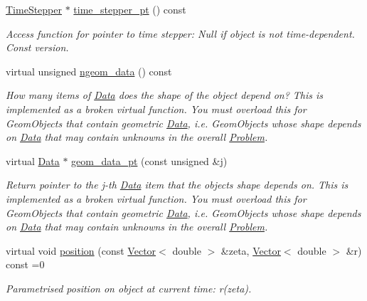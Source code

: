 \begin{DoxyCompactItemize}
\hyperlink{classoomph_1_1TimeStepper}{Time\+Stepper} $\ast$ \hyperlink{classoomph_1_1GeomObject_a02a503606d959d61acb8ca4b94dbc5e6}{time\+\_\+stepper\+\_\+pt} () const
\begin{DoxyCompactList}\small\item\em Access function for pointer to time stepper\+: Null if object is not time-\/dependent. Const version. \end{DoxyCompactList}\item 
virtual unsigned \hyperlink{classoomph_1_1GeomObject_a19d325347e19964e127fe124df56f251}{ngeom\+\_\+data} () const
\begin{DoxyCompactList}\small\item\em How many items of \hyperlink{classoomph_1_1Data}{Data} does the shape of the object depend on? This is implemented as a broken virtual function. You must overload this for Geom\+Objects that contain geometric \hyperlink{classoomph_1_1Data}{Data}, i.\+e. Geom\+Objects whose shape depends on \hyperlink{classoomph_1_1Data}{Data} that may contain unknowns in the overall \hyperlink{classoomph_1_1Problem}{Problem}. \end{DoxyCompactList}\item 
virtual \hyperlink{classoomph_1_1Data}{Data} $\ast$ \hyperlink{classoomph_1_1GeomObject_ae1940fc6a3050e645c3882f2f6f3a202}{geom\+\_\+data\+\_\+pt} (const unsigned \&j)
\begin{DoxyCompactList}\small\item\em Return pointer to the j-\/th \hyperlink{classoomph_1_1Data}{Data} item that the object\textquotesingle{}s shape depends on. This is implemented as a broken virtual function. You must overload this for Geom\+Objects that contain geometric \hyperlink{classoomph_1_1Data}{Data}, i.\+e. Geom\+Objects whose shape depends on \hyperlink{classoomph_1_1Data}{Data} that may contain unknowns in the overall \hyperlink{classoomph_1_1Problem}{Problem}. \end{DoxyCompactList}\item 
virtual void \hyperlink{classoomph_1_1GeomObject_a0d04c9d4667817f3ef24bb660fd56065}{position} (const \hyperlink{classoomph_1_1Vector}{Vector}$<$ double $>$ \&zeta, \hyperlink{classoomph_1_1Vector}{Vector}$<$ double $>$ \&r) const =0
\begin{DoxyCompactList}\small\item\em Parametrised position on object at current time\+: r(zeta). \end{DoxyCompactList}\item 

\end{DoxyCompactItemize}
